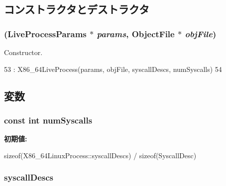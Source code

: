 \subsection{コンストラクタとデストラクタ}
\hypertarget{classX86ISA_1_1X86__64LinuxProcess_adaa4c0fcc6370169609616d5ff41a6a0}{
\subsubsection[{X86\_\-64LinuxProcess}]{ (LiveProcessParams $\ast$ {\em params}, \/  {\bf ObjectFile} $\ast$ {\em objFile})}}
\label{classX86ISA_1_1X86__64LinuxProcess_adaa4c0fcc6370169609616d5ff41a6a0}


Constructor. 


\begin{DoxyCode}
53     : X86_64LiveProcess(params, objFile, syscallDescs, numSyscalls)
54 {}
\end{DoxyCode}


\subsection{変数}
\hypertarget{classX86ISA_1_1X86__64LinuxProcess_af2d1f57bee0c3a25f48faee7ab23c768}{
\subsubsection[{numSyscalls}]{\setlength{\rightskip}{0pt plus 5cm}const int {\bf numSyscalls}}}
\label{classX86ISA_1_1X86__64LinuxProcess_af2d1f57bee0c3a25f48faee7ab23c768}
{\bfseries 初期値:}
\begin{DoxyCode}
 
    sizeof(X86_64LinuxProcess::syscallDescs) / sizeof(SyscallDesc)
\end{DoxyCode}
\hypertarget{classX86ISA_1_1X86__64LinuxProcess_a08d67a94820b75842e07f030e548372e}{
\subsubsection[{syscallDescs}]{ {\bf syscallDescs}}}
\label{classX86ISA_1_1X86__64LinuxProcess_a08d67a94820b75842e07f030e548372e}


